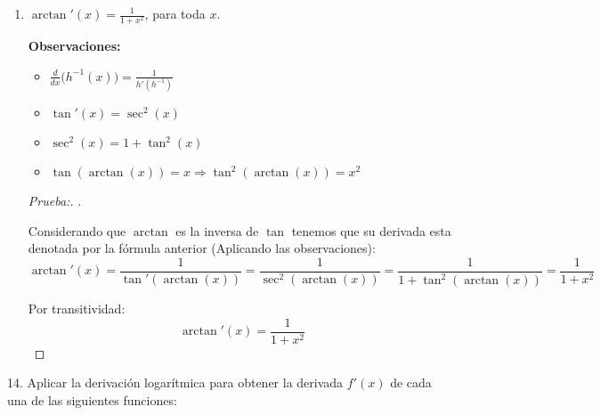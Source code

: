 \documentclass[12pt]{article}
\begin{document}
\begin{enumerate}[\hspace{9px} a)]
        \begin{proof}[Prueba:]
            . \medskip

            Considerando que $\arccos$ es la inversa de $\cos$ tenemos que su derivada esta denotada por la f\'ormula anterior (Aplicando las observaciones):
            \[\arccos'(x) = \frac{1}{\cos'(\arccos(x))} = \frac{1}{-\sin(\arccos(x))}\]

            Despejando \(\sin(x)\) de \(\sin^2(x)+\cos^2(x)=1\), tenemos que: \(\sin(x) = \sqrt{1-\cos^2(x)}\). Sustituyendo lo obtenido en la ecuaci\'on:

            \[-\frac{1}{\sin(\arccos(x))} = -\frac{1}{\sqrt{1-\cos^2(\arcsin(x))}} = -\frac{1}{\sqrt{1-x^2}}\]

            Finalmente, por transitividad:
            \[\arccos'(x) = -\frac{1}{\sqrt{1-x^2}}\]
        \end{proof}

    \item \(\arctan'(x)=\displaystyle\frac{1}{1+x^2}\), para toda $x$. \bigskip
        
        \textbf{Observaciones:}
        \begin{itemize}
            \item \(\displaystyle\frac{d}{dx}\big(h^{-1}(x)\big) = \frac{1}{h'(h^{-1})}\)
            \item \(\tan'(x) = \sec^2(x)\)
            \item \(\sec^2(x)=1+\tan^2(x)\)
            \item \(\tan(\arctan(x))=x \Longrightarrow \tan^2(\arctan(x))=x^2\)
        \end{itemize}

        \begin{proof}[Prueba:]
            . \medskip

            Considerando que $\arctan$ es la inversa de $\tan$ tenemos que su derivada esta denotada por la f\'ormula anterior (Aplicando las observaciones):
            \[\arctan'(x) = \frac{1}{\tan'(\arctan(x))} = \frac{1}{\sec^2(\arctan(x))} = \frac{1}{1+\tan^2(\arctan(x))} = \frac{1}{1+x^2}\]

            Por transitividad:
            \[\arctan'(x) = \frac{1}{1+x^2}\]
        \end{proof}

\end{enumerate}

14. Aplicar la derivaci\'on logar\'itmica para obtener la derivada $f'(x)$ de cada una de las siguientes funciones:
\end{document}
